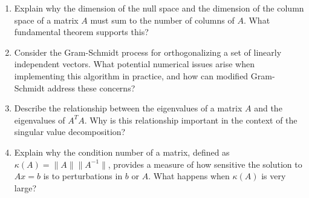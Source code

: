 \documentclass[11pt]{article}
\begin{document}
\begin{enumerate}[label=\textbf{\arabic*.}]
  \item Explain why the dimension of the null space and the dimension of the column space 
  of a matrix $A$ must sum to the number of columns of $A$. What fundamental theorem supports this?

  \item Consider the Gram-Schmidt process for orthogonalizing a set of linearly independent vectors. 
  What potential numerical issues arise when implementing this algorithm in practice, and how can 
  modified Gram-Schmidt address these concerns?

  \item Describe the relationship between the eigenvalues of a matrix $A$ and the eigenvalues of 
  $A^T A$. Why is this relationship important in the context of the singular value decomposition?

  \item Explain why the condition number of a matrix, defined as $\kappa(A) = \|A\| \|A^{-1}\|$, 
  provides a measure of how sensitive the solution to $Ax = b$ is to perturbations in $b$ or $A$. 
  What happens when $\kappa(A)$ is very large?

\end{enumerate}
\end{document}
